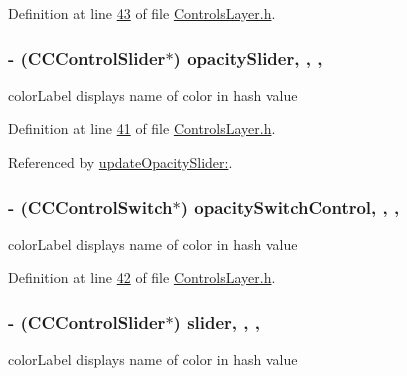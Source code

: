 Definition at line \hyperlink{_controls_layer_8h_source_l00043}{43} of file \hyperlink{_controls_layer_8h_source}{Controls\-Layer.\-h}.

\hypertarget{interface_controls_layer_aff48213936f8ff3b2aa2f44d5125fc6f}{
\subsubsection[{opacity\-Slider}]{\setlength{\rightskip}{0pt plus 5cm}-\/ (C\-C\-Control\-Slider$\ast$) opacity\-Slider\hspace{0.3cm}{\ttfamily [read]}, {\ttfamily [write]}, {\ttfamily [nonatomic]}, {\ttfamily [strong]}}}\label{d1/d1a/interface_controls_layer_aff48213936f8ff3b2aa2f44d5125fc6f}
color\-Label displays name of color in hash value 

Definition at line \hyperlink{_controls_layer_8h_source_l00041}{41} of file \hyperlink{_controls_layer_8h_source}{Controls\-Layer.\-h}.



Referenced by \hyperlink{_controls_layer_8mm_source_l00150}{update\-Opacity\-Slider\-:}.

\hypertarget{interface_controls_layer_ad2bbac273b79a99c46e66c61ea66c88b}{
\subsubsection[{opacity\-Switch\-Control}]{\setlength{\rightskip}{0pt plus 5cm}-\/ (C\-C\-Control\-Switch$\ast$) opacity\-Switch\-Control\hspace{0.3cm}{\ttfamily [read]}, {\ttfamily [write]}, {\ttfamily [nonatomic]}, {\ttfamily [strong]}}}\label{d1/d1a/interface_controls_layer_ad2bbac273b79a99c46e66c61ea66c88b}
color\-Label displays name of color in hash value 

Definition at line \hyperlink{_controls_layer_8h_source_l00042}{42} of file \hyperlink{_controls_layer_8h_source}{Controls\-Layer.\-h}.

\hypertarget{interface_controls_layer_a599701380c37caf4e656efaa860469a3}{
\subsubsection[{slider}]{\setlength{\rightskip}{0pt plus 5cm}-\/ (C\-C\-Control\-Slider$\ast$) slider\hspace{0.3cm}{\ttfamily [read]}, {\ttfamily [write]}, {\ttfamily [nonatomic]}, {\ttfamily [strong]}}}\label{d1/d1a/interface_controls_layer_a599701380c37caf4e656efaa860469a3}
color\-Label displays name of color in hash value 

